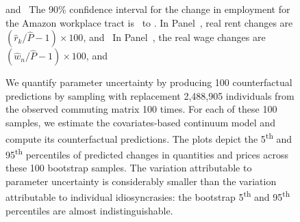\documentclass[11pt]{article}
\theoremstyle{definition}
\begin{document}
\begin{figure}[h!]
\begin{center}
\begin{minipage}{0.96\textwidth}
{and
\unskip\
The 90\% confidence interval for the change in employment for the Amazon workplace tract is \unskip\ to \unskip.
In Panel~\subref*{fig:fixednu:g_realrent},
real rent changes are $(\hat{r}_{k}/\hat{P} - 1) \times 100$,
and
\unskip\
In Panel~,
the real wage changes are $(\hat{w}_{n}/\hat{P} - 1) \times 100$,
and 

We quantify parameter uncertainty by producing 100 counterfactual predictions by
sampling with replacement 2,488,905 individuals from the observed commuting matrix 100 times.
For each of these 100 samples,
we estimate the covariates-based continuum model and compute its counterfactual predictions.
The plots depict the 5\textsuperscript{th} and 95\textsuperscript{th} percentiles of predicted changes in quantities and prices across these 100 bootstrap samples.
The variation attributable to parameter uncertainty is considerably smaller 
than 
the variation attributable to individual idiosyncrasies:
the bootstrap 5\textsuperscript{th} and 95\textsuperscript{th} percentiles are almost indistinguishable.
\par}
\end{minipage}
\end{center}
\end{figure}
\clearpage {}  \appendix
\end{document}
